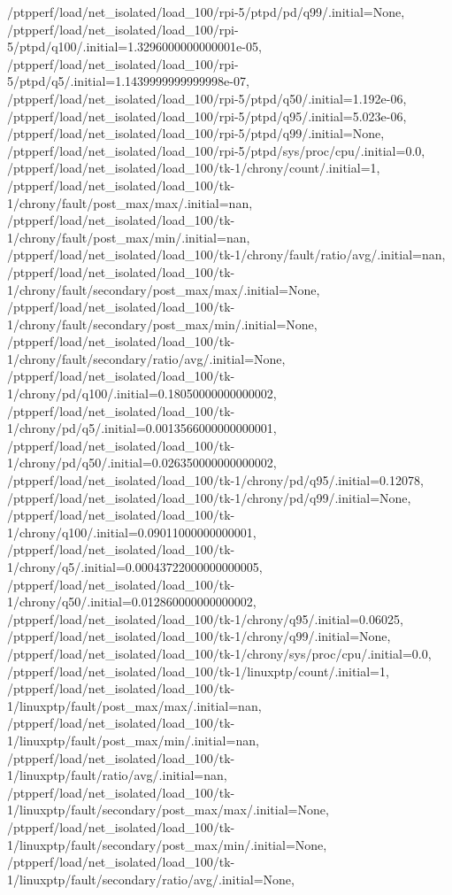 {    /ptpperf/load/net_isolated/load_100/rpi-5/ptpd/pd/q99/.initial=None,
    /ptpperf/load/net_isolated/load_100/rpi-5/ptpd/q100/.initial=1.3296000000000001e-05,
    /ptpperf/load/net_isolated/load_100/rpi-5/ptpd/q5/.initial=1.1439999999999998e-07,
    /ptpperf/load/net_isolated/load_100/rpi-5/ptpd/q50/.initial=1.192e-06,
    /ptpperf/load/net_isolated/load_100/rpi-5/ptpd/q95/.initial=5.023e-06,
    /ptpperf/load/net_isolated/load_100/rpi-5/ptpd/q99/.initial=None,
    /ptpperf/load/net_isolated/load_100/rpi-5/ptpd/sys/proc/cpu/.initial=0.0,
    /ptpperf/load/net_isolated/load_100/tk-1/chrony/count/.initial=1,
    /ptpperf/load/net_isolated/load_100/tk-1/chrony/fault/post_max/max/.initial=nan,
    /ptpperf/load/net_isolated/load_100/tk-1/chrony/fault/post_max/min/.initial=nan,
    /ptpperf/load/net_isolated/load_100/tk-1/chrony/fault/ratio/avg/.initial=nan,
    /ptpperf/load/net_isolated/load_100/tk-1/chrony/fault/secondary/post_max/max/.initial=None,
    /ptpperf/load/net_isolated/load_100/tk-1/chrony/fault/secondary/post_max/min/.initial=None,
    /ptpperf/load/net_isolated/load_100/tk-1/chrony/fault/secondary/ratio/avg/.initial=None,
    /ptpperf/load/net_isolated/load_100/tk-1/chrony/pd/q100/.initial=0.18050000000000002,
    /ptpperf/load/net_isolated/load_100/tk-1/chrony/pd/q5/.initial=0.0013566000000000001,
    /ptpperf/load/net_isolated/load_100/tk-1/chrony/pd/q50/.initial=0.026350000000000002,
    /ptpperf/load/net_isolated/load_100/tk-1/chrony/pd/q95/.initial=0.12078,
    /ptpperf/load/net_isolated/load_100/tk-1/chrony/pd/q99/.initial=None,
    /ptpperf/load/net_isolated/load_100/tk-1/chrony/q100/.initial=0.09011000000000001,
    /ptpperf/load/net_isolated/load_100/tk-1/chrony/q5/.initial=0.00043722000000000005,
    /ptpperf/load/net_isolated/load_100/tk-1/chrony/q50/.initial=0.012860000000000002,
    /ptpperf/load/net_isolated/load_100/tk-1/chrony/q95/.initial=0.06025,
    /ptpperf/load/net_isolated/load_100/tk-1/chrony/q99/.initial=None,
    /ptpperf/load/net_isolated/load_100/tk-1/chrony/sys/proc/cpu/.initial=0.0,
    /ptpperf/load/net_isolated/load_100/tk-1/linuxptp/count/.initial=1,
    /ptpperf/load/net_isolated/load_100/tk-1/linuxptp/fault/post_max/max/.initial=nan,
    /ptpperf/load/net_isolated/load_100/tk-1/linuxptp/fault/post_max/min/.initial=nan,
    /ptpperf/load/net_isolated/load_100/tk-1/linuxptp/fault/ratio/avg/.initial=nan,
    /ptpperf/load/net_isolated/load_100/tk-1/linuxptp/fault/secondary/post_max/max/.initial=None,
    /ptpperf/load/net_isolated/load_100/tk-1/linuxptp/fault/secondary/post_max/min/.initial=None,
    /ptpperf/load/net_isolated/load_100/tk-1/linuxptp/fault/secondary/ratio/avg/.initial=None,
}
